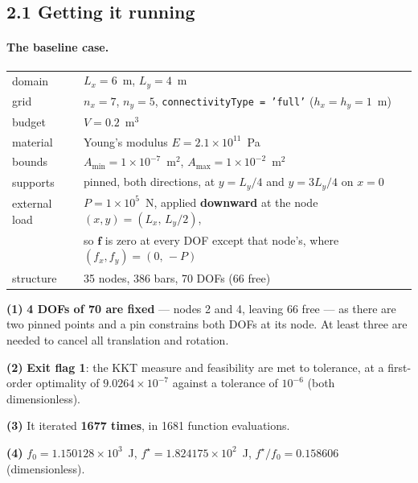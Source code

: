 \documentclass[11pt,a4paper]{article}
\begin{document}
\subsection*{2.1 Getting it running}

\paragraph*{The baseline case.}
\begin{center}\small
\begin{tabular}{@{}ll@{}}
\toprule
domain        & $L_x = 6$~m, \quad $L_y = 4$~m\\
grid          & $n_x = 7$, \quad $n_y = 5$, \quad \texttt{connectivityType = 'full'}
                \quad ($h_x = h_y = 1$~m)\\
budget        & $V = 0.2$~m$^3$\\
material      & Young's modulus $E = 2.1\times10^{11}$~Pa\\
bounds        & $A_{\min} = 1\times10^{-7}$~m$^2$, \quad $A_{\max} = 1\times10^{-2}$~m$^2$\\
supports      & pinned, both directions, at $y = L_y/4$ and $y = 3L_y/4$ on $x = 0$\\
external load & $P = 1\times10^{5}$~N, applied \textbf{downward} at the node
                $(x,y) = (L_x,\,L_y/2)$,\\
              & so $\bm{f}$ is zero at every DOF except that node's, where
                $(f_x,f_y) = (0,\,-P)$\\
structure     & 35 nodes, 386 bars, 70 DOFs (66 free)\\
\bottomrule
\end{tabular}
\end{center}

\textbf{(1)} \textbf{4 DOFs of 70 are fixed} --- nodes 2 and 4, leaving 66 free
--- as there are two pinned points and a pin constrains both DOFs at its node.
At least three are needed to cancel all translation and rotation.

\textbf{(2)} \textbf{Exit flag 1}: the KKT measure and feasibility are met to
tolerance, at a first-order optimality of $9.0264\times10^{-7}$ against a
tolerance of $10^{-6}$ (both dimensionless).

\textbf{(3)} It iterated \textbf{1677 times}, in 1681 function evaluations.

\textbf{(4)} $f_0 = 1.150128\times10^{3}$~J, \quad
$f^\star = 1.824175\times10^{2}$~J, \quad
$f^\star/f_0 = 0.158606$ (dimensionless).
\end{document}
